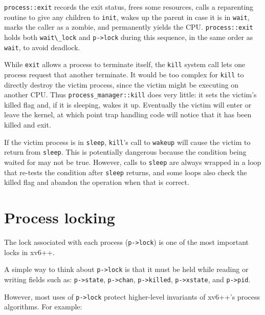 \lstinline{process::exit} records the exit status, frees some resources,
calls a reparenting routine to give any children to \lstinline{init},
wakes up the parent in case it is in \lstinline{wait},
marks the caller as a zombie, and permanently yields the CPU.
\lstinline{process::exit} holds both \lstinline{wait\_lock} and \lstinline{p->lock}
during this sequence, in the same order as \lstinline{wait}, to avoid deadlock.

While \lstinline{exit} allows a process to terminate itself,
the \lstinline{kill} system call lets one process request that another terminate.
It would be too complex for \lstinline{kill} to directly destroy the victim
process, since the victim might be executing on another CPU.
Thus \lstinline{process_manager::kill} does very little: it sets the victim's killed flag
and, if it is sleeping, wakes it up.
Eventually the victim will enter or leave the kernel, at which point
trap handling code will notice that it has been killed and exit.

If the victim process is in \lstinline{sleep},
\lstinline{kill}'s call to \lstinline{wakeup} will cause the victim to return
from \lstinline{sleep}. This is potentially dangerous because the condition
being waited for may not be true. However, calls to \lstinline{sleep} are
always wrapped in a loop that re-tests the condition after \lstinline{sleep}
returns, and some loops also check the killed flag and abandon the operation
when that is correct.

\section{Process locking}

The lock associated with each process (\lstinline{p->lock}) is one of the
most important locks in xv6++.

A simple way to think about \lstinline{p->lock} is
that it must be held while reading or writing fields such as:
\lstinline{p->state},
\lstinline{p->chan},
\lstinline{p->killed},
\lstinline{p->xstate},
and
\lstinline{p->pid}.

However, most uses of \lstinline{p->lock} protect higher-level
invariants of xv6++'s process algorithms. For example:

